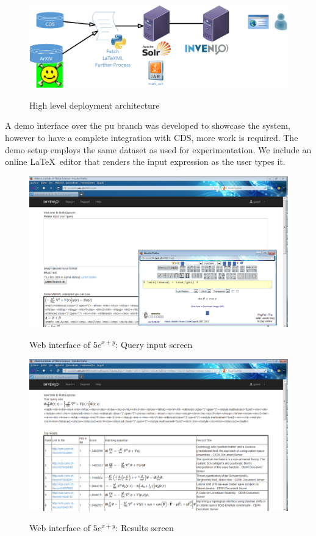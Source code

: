 \begin{figure}[h!]
\includegraphics[height=4.2 cm]{visio_drawings/architecture.png}
\label{system_arch}
\caption{High level deployment architecture}
\end{figure}


A demo interface over the {\codefont pu} branch was developed to showcase the system, however to have a complete integration with CDS, more work is required. The demo setup employs the same dataset as used for experimentation.
We include an online \LaTeX\ editor\cite{latex_editor} that renders the input expression as the user types it. 

\begin{figure}
\center
\includegraphics[height=6.2 cm]{figures/input_interface.png}
\label{input_int}
\caption{Web interface of $5e^{x+y}$: Query input screen}
\end{figure}

\begin{figure}
\center
\includegraphics[height=6.2 cm]{figures/results_interface.png}
\label{results_int}
\caption{Web interface of $5e^{x+y}$: Results screen}
\end{figure}
	
 
